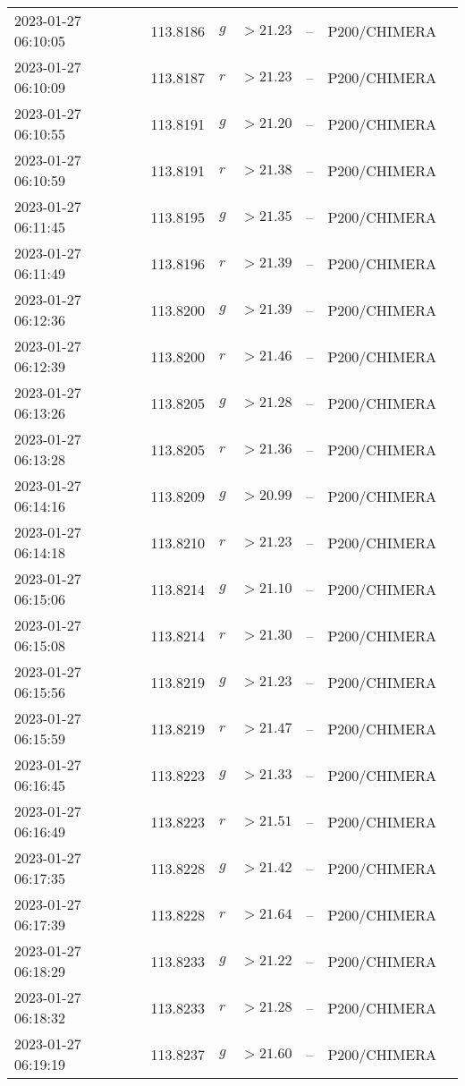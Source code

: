 \documentclass{nature_plusfigure}
\begin{document}
\begin{supplement}
\begin{center}
\begin{longtable}{lllllll}
2023-01-27 06:10:05 & 113.8186 & $g$ & $>21.23$ & -- & P200/CHIMERA &  \\ 
2023-01-27 06:10:09 & 113.8187 & $r$ & $>21.23$ & -- & P200/CHIMERA &  \\ 
2023-01-27 06:10:55 & 113.8191 & $g$ & $>21.20$ & -- & P200/CHIMERA &  \\ 
2023-01-27 06:10:59 & 113.8191 & $r$ & $>21.38$ & -- & P200/CHIMERA &  \\ 
2023-01-27 06:11:45 & 113.8195 & $g$ & $>21.35$ & -- & P200/CHIMERA &  \\ 
2023-01-27 06:11:49 & 113.8196 & $r$ & $>21.39$ & -- & P200/CHIMERA &  \\ 
2023-01-27 06:12:36 & 113.8200 & $g$ & $>21.39$ & -- & P200/CHIMERA &  \\ 
2023-01-27 06:12:39 & 113.8200 & $r$ & $>21.46$ & -- & P200/CHIMERA &  \\ 
2023-01-27 06:13:26 & 113.8205 & $g$ & $>21.28$ & -- & P200/CHIMERA &  \\ 
2023-01-27 06:13:28 & 113.8205 & $r$ & $>21.36$ & -- & P200/CHIMERA &  \\ 
2023-01-27 06:14:16 & 113.8209 & $g$ & $>20.99$ & -- & P200/CHIMERA &  \\ 
2023-01-27 06:14:18 & 113.8210 & $r$ & $>21.23$ & -- & P200/CHIMERA &  \\ 
2023-01-27 06:15:06 & 113.8214 & $g$ & $>21.10$ & -- & P200/CHIMERA &  \\ 
2023-01-27 06:15:08 & 113.8214 & $r$ & $>21.30$ & -- & P200/CHIMERA &  \\ 
2023-01-27 06:15:56 & 113.8219 & $g$ & $>21.23$ & -- & P200/CHIMERA &  \\ 
2023-01-27 06:15:59 & 113.8219 & $r$ & $>21.47$ & -- & P200/CHIMERA &  \\ 
2023-01-27 06:16:45 & 113.8223 & $g$ & $>21.33$ & -- & P200/CHIMERA &  \\ 
2023-01-27 06:16:49 & 113.8223 & $r$ & $>21.51$ & -- & P200/CHIMERA &  \\ 
2023-01-27 06:17:35 & 113.8228 & $g$ & $>21.42$ & -- & P200/CHIMERA &  \\ 
2023-01-27 06:17:39 & 113.8228 & $r$ & $>21.64$ & -- & P200/CHIMERA &  \\ 
2023-01-27 06:18:29 & 113.8233 & $g$ & $>21.22$ & -- & P200/CHIMERA &  \\ 
2023-01-27 06:18:32 & 113.8233 & $r$ & $>21.28$ & -- & P200/CHIMERA &  \\ 
2023-01-27 06:19:19 & 113.8237 & $g$ & $>21.60$ & -- & P200/CHIMERA &  \\ 

\end{longtable}
\end{center}
\end{supplement}
\end{document}
